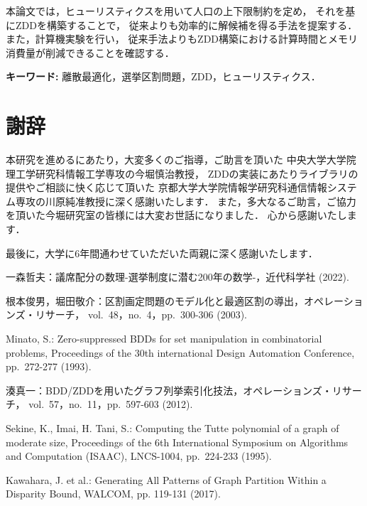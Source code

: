 ﻿\documentclass[a4j,12pt]{jreport}
\def\syaji{ \chapter*{謝辞} \addcontentsline{toc}{chapter}{謝辞}}
\begin{document}
本論文では，ヒューリスティクスを用いて人口の上下限制約を定め，
それを基にZDDを構築することで，
従来よりも効率的に解候補を得る手法を提案する．
また，計算機実験を行い，
従来手法よりもZDD構築における計算時間とメモリ消費量が削減できることを確認する．


\vspace{1zw} \noindent
{\bf キーワード: }離散最適化，選挙区割問題，ZDD，ヒューリスティクス．

\tableofcontents


\newpage
{}








\syaji
\par
本研究を進めるにあたり，大変多くのご指導，ご助言を頂いた
中央大学大学院理工学研究科情報工学専攻の今堀慎治教授，
ZDDの実装にあたりライブラリの提供やご相談に快く応じて頂いた
京都大学大学院情報学研究科通信情報システム専攻の川原純准教授に深く感謝いたします．
また，多大なるご助言，ご協力を頂いた今堀研究室の皆様には大変お世話になりました．
心から感謝いたします．

最後に，大学に6年間通わせていただいた両親に深く感謝いたします．

\begin{thebibliography}{99}

一森哲夫：議席配分の数理-選挙制度に潜む200年の数学-，近代科学社 (2022).

根本俊男，堀田敬介：区割画定問題のモデル化と最適区割の導出，オペレーションズ・リサーチ，
vol.~48，no.~4，pp.~300-306 (2003).

Minato, S.: Zero-suppressed BDDs for set manipulation in combinatorial problems,
Proceedings of the 30th international Design Automation Conference,
pp.~272-277 (1993).

湊真一：BDD/ZDDを用いたグラフ列挙索引化技法，オペレーションズ・リサーチ，
vol.~57，no.~11，pp.~597-603 (2012).

Sekine, K., Imai, H. Tani, S.: Computing the Tutte polynomial of a graph of moderate size,
Proceedings of the 6th International Symposium on Algorithms and Computation (ISAAC),
LNCS-1004, pp.~224-233 (1995).

  Kawahara, J. et al.: Generating All Patterns of Graph Partition Within a Disparity Bound,
  WALCOM, pp. 119-131 (2017).

\end{thebibliography}

\end{document}
